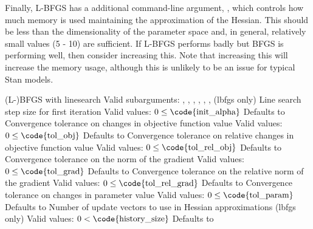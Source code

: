 Finally, L-BFGS has a additional command-line argument, ,
which controls how much memory is used maintaining the approximation of
the Hessian.  This should be less than the dimensionality of the parameter
space and, in general, relatively small values (5 - 10) are sufficient.
If L-BFGS performs badly but BFGS is performing well, then consider increasing
this.  Note that increasing this will increase the memory usage, although
this is unlikely to be an issue for typical Stan models.
%
\begin{description}
        {(L-)BFGS with linesearch}
        {Valid subarguments: , , , , , ,  (lbfgs only)}
%
           {Line search step size for first iteration}
           {Valid values: $0 \leq \mbox{\code{init\_alpha}}$}
           {Defaults to }
%
           {Convergence tolerance on changes in objective function value}
           {Valid values: $0 \leq \mbox{\code{tol\_obj}}$}
           {Defaults to }
%
           {Convergence tolerance on relative changes in objective function value}
           {Valid values: $0 \leq \mbox{\code{tol\_rel\_obj}}$}
           {Defaults to }
%
        {Convergence tolerance on the norm of the gradient}
        {Valid values: $0 \leq \mbox{\code{tol\_grad}}$}
        {Defaults to }
%
        {Convergence tolerance on the relative norm of the gradient}
        {Valid values: $0 \leq \mbox{\code{tol\_rel\_grad}}$}
        {Defaults to }
%
        {Convergence tolerance on changes in parameter value}
        {Valid values: $0 \leq \mbox{\code{tol\_param}}$}
        {Defaults to }
%
           {Number of update vectors to use in Hessian approximations (lbfgs only)}
           {Valid values: $0 < \mbox{\code{history\_size}}$}
           {Defaults to }
%
\end{description}
